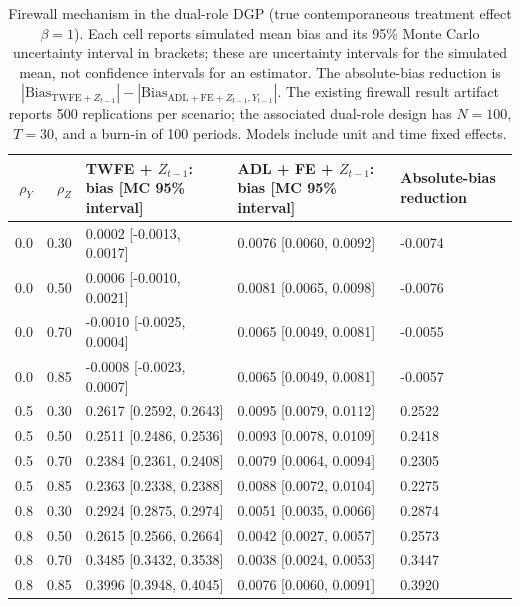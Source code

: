 \begin{table}[H]
\centering
\caption{Firewall mechanism in the dual-role DGP (true contemporaneous treatment effect $\beta=1$). Each cell reports simulated mean bias and its 95\% Monte Carlo uncertainty interval in brackets; these are uncertainty intervals for the simulated mean, not confidence intervals for an estimator. The absolute-bias reduction is $|\mathrm{Bias}_{\mathrm{TWFE}+Z_{t-1}}|-|\mathrm{Bias}_{\mathrm{ADL+FE}+Z_{t-1},Y_{t-1}}|$. The existing firewall result artifact reports 500 replications per scenario; the associated dual-role design has $N=100$, $T=30$, and a burn-in of 100 periods. Models include unit and time fixed effects.}
\label{tab:firewall_pa}
\scriptsize
\begin{tabular}{rrlll}
\toprule
$\rho_Y$ & $\rho_Z$ & TWFE + $Z_{t-1}$: bias [MC 95\% interval] & ADL + FE + $Z_{t-1}$: bias [MC 95\% interval] & Absolute-bias reduction \\
\midrule
0.0 & 0.30 & 0.0002 [-0.0013, 0.0017] & 0.0076 [0.0060, 0.0092] & -0.0074 \\
0.0 & 0.50 & 0.0006 [-0.0010, 0.0021] & 0.0081 [0.0065, 0.0098] & -0.0076 \\
0.0 & 0.70 & -0.0010 [-0.0025, 0.0004] & 0.0065 [0.0049, 0.0081] & -0.0055 \\
0.0 & 0.85 & -0.0008 [-0.0023, 0.0007] & 0.0065 [0.0049, 0.0081] & -0.0057 \\
0.5 & 0.30 & 0.2617 [0.2592, 0.2643] & 0.0095 [0.0079, 0.0112] & 0.2522 \\
0.5 & 0.50 & 0.2511 [0.2486, 0.2536] & 0.0093 [0.0078, 0.0109] & 0.2418 \\
0.5 & 0.70 & 0.2384 [0.2361, 0.2408] & 0.0079 [0.0064, 0.0094] & 0.2305 \\
0.5 & 0.85 & 0.2363 [0.2338, 0.2388] & 0.0088 [0.0072, 0.0104] & 0.2275 \\
0.8 & 0.30 & 0.2924 [0.2875, 0.2974] & 0.0051 [0.0035, 0.0066] & 0.2874 \\
0.8 & 0.50 & 0.2615 [0.2566, 0.2664] & 0.0042 [0.0027, 0.0057] & 0.2573 \\
0.8 & 0.70 & 0.3485 [0.3432, 0.3538] & 0.0038 [0.0024, 0.0053] & 0.3447 \\
0.8 & 0.85 & 0.3996 [0.3948, 0.4045] & 0.0076 [0.0060, 0.0091] & 0.3920 \\
\bottomrule
\end{tabular}
\end{table}
